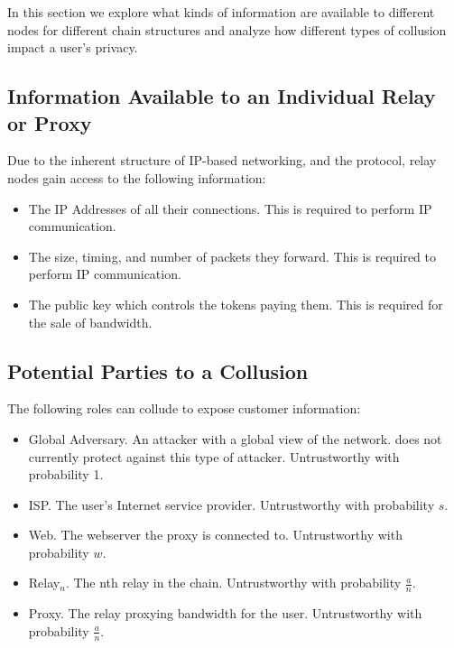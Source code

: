 In this section we explore what kinds of information are available to
different nodes for different chain structures and analyze how
different types of collusion impact a user's privacy.

\subsection{Information Available to an Individual Relay or Proxy}
\label{relay-proxy-info-known}

Due to the inherent structure of IP-based networking, and the \Orchid{} protocol, relay nodes gain access to the following information:

\begin{itemize}
\item The IP Addresses of all their connections. This is required to perform IP communication.
\item The size, timing, and number of packets they forward. This is required to perform IP communication.
\item The public key which controls the tokens paying them. This is required for the sale of bandwidth.
\end{itemize}

\subsection{Potential Parties to a Collusion}
\label{sec:collusion}

The following roles can collude to expose customer information:

\begin{itemize}
\item Global Adversary. An attacker with a global view of the network. \Orchid{} does not currently protect against this type of attacker. Untrustworthy with probability 1.
\item ISP. The user's Internet service provider. Untrustworthy with probability $s$.
\item Web. The webserver the proxy is connected to. Untrustworthy with probability $w$.
\item Relay$_n$. The nth relay in the chain. Untrustworthy with probability $\frac{a}{n}$.
\item Proxy. The relay proxying bandwidth for the user. Untrustworthy with probability $\frac{a}{n}$.
\end{itemize}

